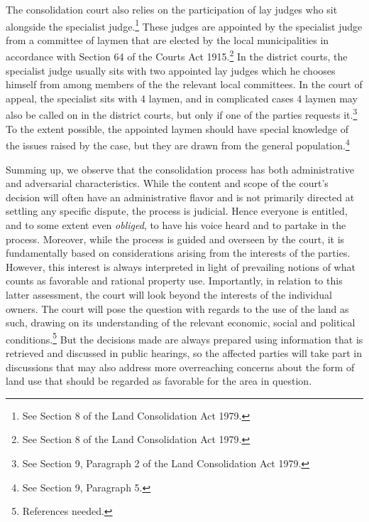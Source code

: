 \documentclass[10pt]{article} %
\begin{document}
The consolidation court also relies on the participation of lay judges who sit alongside the specialist judge.\footnote{See Section 8 of the Land Consolidation Act 1979.} These judges are appointed by the specialist judge from a committee of laymen that are elected by the local municipalities in accordance with Section 64 of the Courts Act 1915.\footnote{See Section 8 of the Land Consolidation Act 1979.} In the district courts, the specialist judge usually sits with two appointed lay judges which he chooses himself from among members of the the relevant local committees. In the court of appeal, the specialist sits with 4 laymen, and in complicated cases 4 laymen may also be called on in the district courts, but only if one of the parties requests it.\footnote{See Section 9, Paragraph 2 of the Land Consolidation Act 1979.} To the extent possible, the appointed laymen should have special knowledge of the issues raised by the case, but they are drawn from the general population.\footnote{See Section 9, Paragraph 5.}

Summing up, we observe that the consolidation process has both administrative and adversarial characteristics. While the content and scope of the court's decision will often have an administrative flavor and is not primarily directed at settling any specific dispute, the process is judicial. Hence everyone is entitled, and to some extent even \emph{obliged}, to have his voice heard and to partake in the process. Moreover, while the process is guided and overseen by the court, it is fundamentally based on considerations arising from the interests of the parties. However, this interest is always interpreted in light of prevailing notions of what counts as favorable and rational property use. Importantly, in relation to this latter assessment, the court will look beyond the interests of the individual owners. The court will pose the question with regards to the use of the land as such, drawing on its understanding of the relevant economic, social and political conditions.\footnote{References needed.} But the decisions made are always prepared using information that is retrieved and discussed in public hearings, so the affected parties will take part in discussions that may also address more overreaching concerns about the form of land use that should be regarded as favorable for the area in question.
\end{document}
